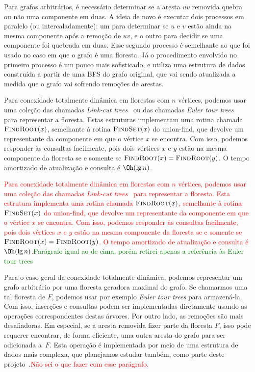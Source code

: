 Para grafos arbitrários, é necessário determinar se a aresta $uv$ removida quebra ou não uma 
componente em duas.  A ideia de novo é executar dois processos em paralelo (ou intercaladamente): 
um para determinar se $u$ e $v$ estão ainda na mesma componente após a remoção de $uv$, e o
outro para decidir se uma componente foi quebrada em duas.  Esse segundo processo é semelhante
ao que foi usado no caso em que o grafo é uma floresta.  Já o procedimento envolvido no 
primeiro processo é um pouco mais sofisticado, e utiliza uma estrutura de dados construída 
a partir de uma BFS do grafo original, que vai sendo atualizada a medida que o grafo vai 
sofrendo remoções de arestas. 

\newcommand{\FindRoot}{\mbox{\sc FindRoot}}
\newcommand{\FindSet}{\mbox{\sc FindSet}}

Para conexidade totalmente dinâmica em florestas com $n$ vértices, 
podemos usar uma coleção das chamadas \emph{Link-cut trees}~\cite{SleatorT1983} ou 
das chamadas \emph{Euler tour trees}~\cite{HenzingerK1995} para representar a floresta.  
Estas estruturas implementam uma rotina chamada $\FindRoot(x)$, 
semelhante à rotina $\FindSet(x)$ do union-find, que devolve 
um representante da componente em que o vértice $x$ se encontra. 
Com isso, podemos responder às consultas facilmente, pois dois vértices $x$ e $y$ 
estão na mesma componente da floresta se e somente se $\FindRoot(x) = \FindRoot(y)$.
O tempo amortizado de atualização e consulta é $\Oh(\lg n)$.

\textcolor{red}{Para conexidade totalmente dinâmica em florestas com $n$ vértices, 
podemos usar uma coleção das chamadas \emph{Link-cut trees}~\cite{SleatorT1983} para representar a floresta.  
Esta estrutura implementa uma rotina chamada $\FindRoot(x)$, 
semelhante à rotina $\FindSet(x)$ do union-find, que devolve 
um representante da componente em que o vértice $x$ se encontra. 
Com isso, podemos responder às consultas facilmente, pois dois vértices $x$ e $y$ 
estão na mesma componente da floresta se e somente se $\FindRoot(x) = \FindRoot(y)$.
O tempo amortizado de atualização e consulta é $\Oh(\lg n)$.}\textcolor{green}{Parágrafo igual ao de cima, porém retirei apenas a referência às Euler tour trees}

Para o caso geral da conexidade totalmente dinâmica, podemos representar um grafo arbitrário  
por uma floresta geradora maximal do grafo.  Se chamarmos uma tal floresta de $F$, podemos 
usar por exemplo \emph{Euler tour trees} para armazená-la.  Com isso, inserções e consultas 
podem ser implementadas diretamente usando as operações correspondentes destas árvores.  
Por outro lado, as remoções são mais desafiadoras.  Em especial, se a aresta removida fizer
parte da floresta $F$, isso pode requerer encontrar, de forma eficiente, uma outra aresta 
do grafo para ser adicionada a~$F$. Esta operação é implementada por meio de uma estrutura
de dados mais complexa, que planejamos estudar também, como parte deste projeto~\cite{DemaineL2007}.\textcolor{red}{Não sei o que fazer com esse parágrafo}. 


\newpage
